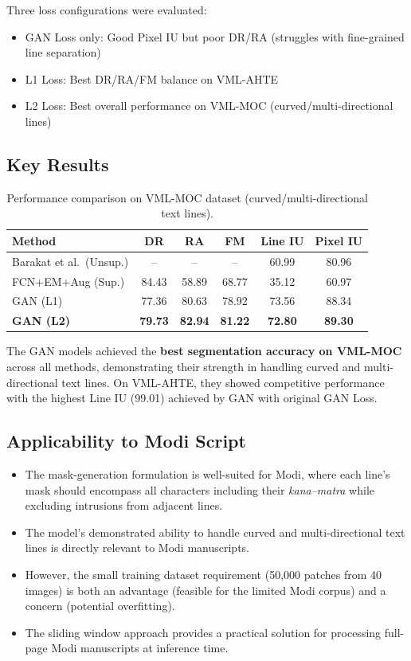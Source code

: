 \documentclass[11pt, a4paper]{article}
\begin{document}
Three loss configurations were evaluated:
\begin{itemize}[leftmargin=1.5em]
    \item GAN Loss only: Good Pixel IU but poor DR/RA (struggles with fine-grained line separation)
    \item L1 Loss: Best DR/RA/FM balance on VML-AHTE
    \item L2 Loss: Best overall performance on VML-MOC (curved/multi-directional lines)
\end{itemize}

\subsection{Key Results}

\begin{table}[H]
\centering
\caption{Performance comparison on VML-MOC dataset (curved/multi-directional text lines).}
\begin{tabular}{lccccc}
\toprule
\textbf{Method} & \textbf{DR} & \textbf{RA} & \textbf{FM} & \textbf{Line IU} & \textbf{Pixel IU} \\
\midrule
Barakat et al.\ (Unsup.) & -- & -- & -- & 60.99 & 80.96 \\
FCN+EM+Aug (Sup.)       & 84.43 & 58.89 & 68.77 & 35.12 & 60.97 \\
GAN (L1)                & 77.36 & 80.63 & 78.92 & 73.56 & 88.34 \\
\textbf{GAN (L2)}       & \textbf{79.73} & \textbf{82.94} & \textbf{81.22} & \textbf{72.80} & \textbf{89.30} \\
\bottomrule
\end{tabular}
\label{tab:gan_vml_moc}
\end{table}

The GAN models achieved the \textbf{best segmentation accuracy on VML-MOC} across all methods, demonstrating their strength in handling curved and multi-directional text lines. On VML-AHTE, they showed competitive performance with the highest Line IU (99.01) achieved by GAN with original GAN Loss.

\subsection{Applicability to Modi Script}

\begin{itemize}[leftmargin=1.5em]
    \item The mask-generation formulation is well-suited for Modi, where each line's mask should encompass all characters including their \textit{kana--matra} while excluding intrusions from adjacent lines.
    \item The model's demonstrated ability to handle curved and multi-directional text lines is directly relevant to Modi manuscripts.
    \item However, the small training dataset requirement (50,000 patches from 40 images) is both an advantage (feasible for the limited Modi corpus) and a concern (potential overfitting).
    \item The sliding window approach provides a practical solution for processing full-page Modi manuscripts at inference time.
\end{itemize}
\end{document}
